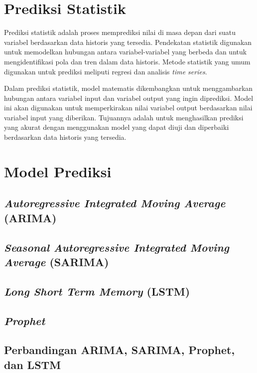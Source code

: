 \section{Prediksi Statistik}
Prediksi statistik adalah proses memprediksi nilai di masa depan dari suatu variabel berdasarkan data historis yang tersedia. Pendekatan statistik digunakan untuk memodelkan hubungan antara variabel-variabel yang berbeda dan untuk mengidentifikasi pola dan tren dalam data historis. Metode statistik yang umum digunakan untuk prediksi meliputi regresi dan analisis \textit{time series}.

Dalam prediksi statistik, model matematis dikembangkan untuk menggambarkan hubungan antara variabel input dan variabel output yang ingin diprediksi. Model ini akan digunakan untuk memperkirakan nilai variabel output berdasarkan nilai variabel input yang diberikan. Tujuannya adalah untuk menghasilkan prediksi yang akurat dengan menggunakan model yang dapat diuji dan diperbaiki berdasarkan data historis yang tersedia.

\section{Model Prediksi}

\subsection{\textit{Autoregressive Integrated Moving Average} (ARIMA)}

\subsection{\textit{Seasonal Autoregressive Integrated Moving Average} (SARIMA)}

\subsection{\textit{Long Short Term Memory} (LSTM)}

\subsection{\textit{Prophet}}

\subsection{Perbandingan ARIMA, SARIMA, Prophet, dan LSTM}

